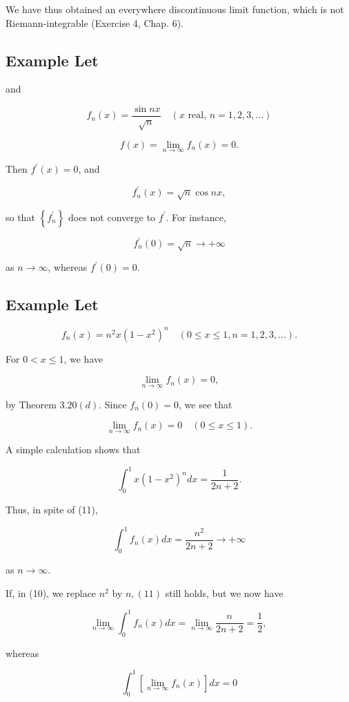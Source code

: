 \documentclass[10pt]{article}
\begin{document}
We have thus obtained an everywhere discontinuous limit function, which is not Riemann-integrable (Exercise 4, Chap. 6).

\subsection{Example Let}
and

$$
f_{n}(x)=\frac{\sin n x}{\sqrt{n}} \quad(x \text { real, } n=1,2,3, \ldots)
$$

$$
f(x)=\lim _{n \rightarrow \infty} f_{n}(x)=0 .
$$

Then $f^{\prime}(x)=0$, and

$$
f_{n}^{\prime}(x)=\sqrt{n} \cos n x,
$$

so that $\left\{f_{n}^{\prime}\right\}$ does not converge to $f^{\prime}$. For instance,

$$
f_{n}^{\prime}(0)=\sqrt{n} \rightarrow+\infty
$$

as $n \rightarrow \infty$, whereas $f^{\prime}(0)=0$.

\subsection{Example Let}
$$
f_{n}(x)=n^{2} x\left(1-x^{2}\right)^{n} \quad(0 \leq x \leq 1, n=1,2,3, \ldots) .
$$

For $0<x \leq 1$, we have

$$
\lim _{n \rightarrow \infty} f_{n}(x)=0,
$$

by Theorem $3.20(d)$. Since $f_{n}(0)=0$, we see that

$$
\lim _{n \rightarrow \infty} f_{n}(x)=0 \quad(0 \leq x \leq 1) .
$$

A simple calculation shows that

$$
\int_{0}^{1} x\left(1-x^{2}\right)^{n} d x=\frac{1}{2 n+2} .
$$

Thus, in spite of (11),

$$
\int_{0}^{1} f_{n}(x) d x=\frac{n^{2}}{2 n+2} \rightarrow+\infty
$$

as $n \rightarrow \infty$.

If, in (10), we replace $n^{2}$ by $n,(11)$ still holds, but we now have

$$
\lim _{n \rightarrow \infty} \int_{0}^{1} f_{n}(x) d x=\lim _{n \rightarrow \infty} \frac{n}{2 n+2}=\frac{1}{2} \text {, }
$$

whereas

$$
\int_{0}^{1}\left[\lim _{n \rightarrow \infty} f_{n}(x)\right] d x=0
$$
\end{document}

